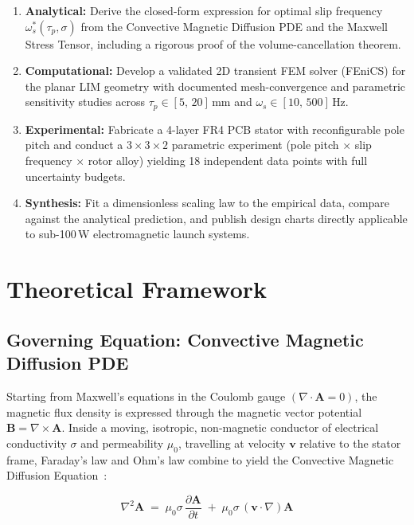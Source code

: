 \documentclass[12pt,letterpaper]{article}
\begin{document}
\begin{enumerate}[label=\textbf{O\arabic*.}, leftmargin=2.2cm]
  \item \textbf{Analytical:} Derive the closed-form expression for optimal slip frequency
    $\omega_s^*(\tau_p, \sigma)$ from the Convective Magnetic Diffusion PDE and the
    Maxwell Stress Tensor, including a rigorous proof of the volume-cancellation theorem.
  \item \textbf{Computational:} Develop a validated 2D transient FEM solver (FEniCS) for
    the planar LIM geometry with documented mesh-convergence and parametric sensitivity
    studies across $\tau_p \in [5,\,20]\,$mm and $\omega_s \in [10,\,500]\,$Hz.
  \item \textbf{Experimental:} Fabricate a 4-layer FR4 PCB stator with reconfigurable
    pole pitch and conduct a $3 \times 3 \times 2$ parametric experiment (pole pitch
    $\times$ slip frequency $\times$ rotor alloy) yielding 18 independent data points
    with full uncertainty budgets.
  \item \textbf{Synthesis:} Fit a dimensionless scaling law to the empirical data, compare
    against the analytical prediction, and publish design charts directly applicable to
    sub-100\,W electromagnetic launch systems.
\end{enumerate}

\section{Theoretical Framework}

\subsection{Governing Equation: Convective Magnetic Diffusion PDE}

Starting from Maxwell's equations in the Coulomb gauge $(\nabla \cdot \mathbf{A} = 0)$,
the magnetic flux density is expressed through the magnetic vector potential
$\mathbf{B} = \nabla \times \mathbf{A}$. Inside a moving, isotropic, non-magnetic conductor
of electrical conductivity $\sigma$ and permeability $\mu_0$, travelling at velocity
$\mathbf{v}$ relative to the stator frame, Faraday's law and Ohm's law combine to yield
the Convective Magnetic Diffusion Equation~\cite{Davidson2001}:

\begin{equation}
  \boxed{
  \nabla^2 \mathbf{A} \;=\; \mu_0\sigma\,\frac{\partial \mathbf{A}}{\partial t}
  \;+\; \mu_0\sigma\,(\mathbf{v}\cdot\nabla)\mathbf{A}
  }
  \label{eq:cmd}
\end{equation}
\end{document}
